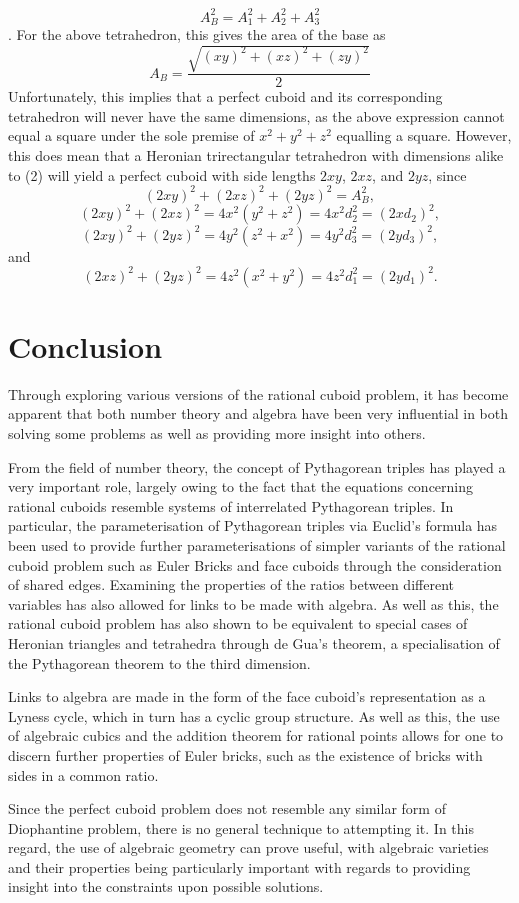 \documentclass[11pt]{article}
\begin{document}
$$A_B^2=A_1^2+A_2^2+A_3^2$$.
For the above tetrahedron, this gives the area of the base as
$$A_B=\frac{\sqrt{(xy)^2+(xz)^2+(zy)^2}}{2}$$
Unfortunately, this implies that a perfect cuboid and its corresponding tetrahedron will never have the same dimensions, as the above expression cannot equal a square under the sole premise of $x^2+y^2+z^2$ equalling a square. However, this does mean that a Heronian trirectangular tetrahedron with dimensions alike to (2) will yield a perfect cuboid with side lengths $2xy$, $2xz$, and $2yz$, since
$$(2xy)^2+(2xz)^2+(2yz)^2=A_B^2,$$
$$(2xy)^2+(2xz)^2=4x^2(y^2+z^2)=4x^2d_2^2=(2xd_2)^2,$$
$$(2xy)^2+(2yz)^2=4y^2(z^2+x^2)=4y^2d_3^2=(2yd_3)^2,$$
and
$$(2xz)^2+(2yz)^2=4z^2(x^2+y^2)=4z^2d_1^2=(2yd_1)^2.$$

\section{Conclusion}
Through exploring various versions of the rational cuboid problem, it has become apparent that both number theory and algebra have been very influential in both solving some problems as well as providing more insight into others. 

From the field of number theory, the concept of Pythagorean triples has played a very important role, largely owing to the fact that the equations concerning rational cuboids resemble systems of interrelated Pythagorean triples. In particular, the parameterisation of Pythagorean triples via Euclid's formula has been used to provide further parameterisations of simpler variants of the rational cuboid problem such as Euler Bricks and face cuboids through the consideration of shared edges. Examining the properties of the ratios between different variables has also allowed for links to be made with algebra. As well as this, the rational cuboid problem has also shown to be equivalent to special cases of Heronian triangles and tetrahedra through de Gua's theorem, a specialisation of the Pythagorean theorem to the third dimension. 

Links to algebra are made in the form of the face cuboid's representation as a Lyness cycle, which in turn has a cyclic group structure. As well as this, the use of algebraic cubics and the addition theorem for rational points allows for one to discern further properties of Euler bricks, such as the existence of bricks with sides in a common ratio.

Since the perfect cuboid problem does not resemble any similar form of Diophantine problem, there is no general technique to attempting it. In this regard, the use of algebraic geometry can prove useful, with algebraic varieties and their properties being particularly important with regards to providing insight into the constraints upon possible solutions.
\end{document}
